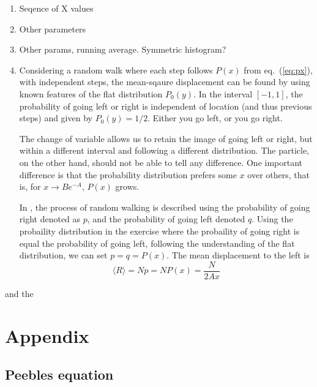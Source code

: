 \documentclass[a4paper,11pt]{article}
\begin{document}
\begin{enumerate}
    \item Seqence of X values
    \item Other parameters
    \item Other params, running average. Symmetric histogram?
    \item Considering a random walk where each step follows $P(x)$ from eq.~(\ref{eq:px}), with independent steps, the mean-sqaure displacement can be found by using known features of the flat distribution $P_0(y)$. In the interval $[-1,1]$, the probability of going left or right is independent of location (and thus previous steps) and given by $P_0(y) = 1/2$. Either you go left, or you go right.

        The change of variable allows us to retain the image of going left or right, but within a different interval and following a different distribution. The particle, on the other hand, should not be able to tell any difference. One important difference is that the probability distribution prefers some $x$ over others, that is, for $x \to Be^{-A}$, $P(x)$ grows.  

        In \citet{2014Flekkoy}, the process of random walking is described using the probability of going right denoted as $p$, and the probability of going left denoted $q$. Using the probaility distribution in the exercise where the probaility of going right is equal the probability of going left, following the understanding of the flat distribution, we can set $p = q = P(x)$. The mean displacement to the left is 
        \begin{equation}
            \langle R \rangle = Np = NP(x) = \frac{N}{2Ax}
            \label{eq:average_right}
        \end{equation}
\end{enumerate}
and the 



%
%

\clearpage
\appendix
\section{Appendix}
\label{sec:appendix}

\subsection{Peebles equation}
\label{app:peebles}

%
\end{document}
